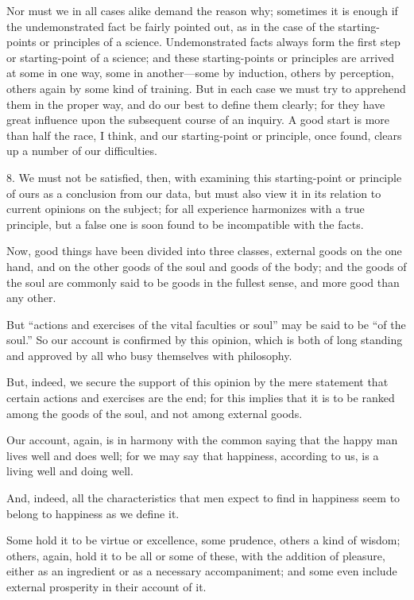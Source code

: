Nor must we in all cases alike demand the reason why; sometimes it is
enough if the undemonstrated fact be fairly pointed out, as in the
case of the starting-points or principles of a science. Undemonstrated
facts always form the first step or starting-point of a science; and
these starting-points or principles are arrived at some in one way,
some in another---some by induction, others by perception, others
again by some kind of training. But in each case we must try to
apprehend them in the proper way, and do our best to define them
clearly; for they have great influence upon the subsequent course of
an inquiry. A good start is more than half the race, I think, and our
starting-point or principle, once found, clears up a number of our
difficulties.

8. We must not be satisfied, then, with examining this starting-point
or principle of ours as a conclusion from our data, but must also view
it in its relation to current opinions on the subject; for all
experience harmonizes with a true principle, but a false one is soon
found to be incompatible with the facts.

Now, good things have been divided into three classes, external goods
on the one hand, and on the other goods of the soul and goods of the
body; and the goods of the soul are commonly said to be goods in the
fullest sense, and more good than any other.

But ``actions and exercises of the vital faculties or soul'' may be
said to be ``of the soul.'' So our account is confirmed by this
opinion, which is both of long  standing and approved by all
who busy themselves with philosophy.

But, indeed, we secure the support of this opinion by the mere
statement that certain actions and exercises are the end; for this
implies that it is to be ranked among the goods of the soul, and not
among external goods.

Our account, again, is in harmony with the common saying that the
happy man lives well and does well; for we may say that happiness,
according to us, is a living well and doing well.

And, indeed, all the characteristics that men expect to find in
happiness seem to belong to happiness as we define it.

Some hold it to be virtue or excellence, some prudence, others a kind
of wisdom; others, again, hold it to be all or some of these, with the
addition of pleasure, either as an ingredient or as a necessary
accompaniment; and some even include external prosperity in their
account of it.

